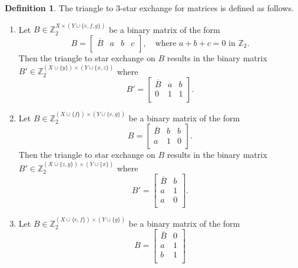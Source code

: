 \documentclass{article}
\theoremstyle{definition}
\newtheorem{definition}{Definition}
\begin{document}
\begin{definition}\label{def:triangle_star_exchange}
    The triangle to 3-star exchange for matrices is defined as follows.
    \begin{enumerate}
        \item Let $B \in \mathbb{Z}_{2}^{X \times (Y \cup \{e, f, g\})}$ be a binary matrix of the form
        \[
            B = \begin{bmatrix}
                \overline{B} & a & b & c \\
            \end{bmatrix}
            , \quad
            \text{where $a + b + c = 0$ in $\mathbb{Z}_{2}$.}
        \]
        Then the triangle to star exchange on $B$ results in the binary matrix $B' \in \mathbb{Z}_{2}^{(X \cup \{y\}) \times (Y \cup \{x, z\})}$ where
        \[
            B' = \begin{bmatrix}
                \overline{B} & a & b \\
                0 & 1 & 1 \\
            \end{bmatrix}.
        \]
        \item Let $B \in \mathbb{Z}_{2}^{(X \cup \{f\}) \times (Y \cup \{e, g\})}$ be a binary matrix of the form
        \[
            B = \begin{bmatrix}
                \overline{B} & b & b \\
                a & 1 & 0 \\
            \end{bmatrix}.
        \]
        Then the triangle to star exchange on $B$ results in the binary matrix $B' \in \mathbb{Z}_{2}^{(X \cup \{z, y\}) \times (Y \cup \{x\})}$ where
        \[
            B' = \begin{bmatrix}
                \overline{B} & b \\
                a & 1 \\
                a & 0 \\
            \end{bmatrix}.
        \]
        \item Let $B \in \mathbb{Z}_{2}^{(X \cup \{e, f\}) \times (Y \cup \{g\})}$ be a binary matrix of the form
        \[
            B = \begin{bmatrix}
                \overline{B} & 0 \\
                a & 1 \\
                b & 1 \\
            \end{bmatrix}
\]
\end{enumerate}
\end{definition}
\end{document}
